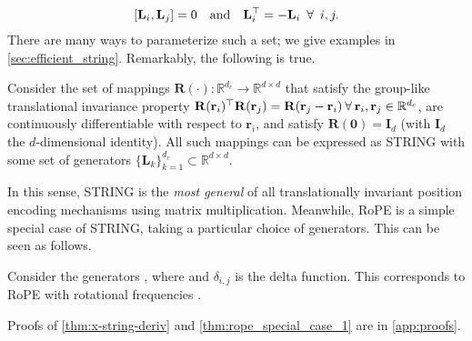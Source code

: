 \begin{equation}
    \left[\mathbf{L}_i, \mathbf{L}_j\right]=0  \quad \textrm{and} \quad \mathbf{L}_i^\top = -\mathbf{L}_i \hspace{0.5em} \forall \hspace{0.5em} i,j.
\end{equation}
There are many ways to parameterize such a set; we give examples in \cref{sec:efficient_string}.
Remarkably, the following is true. 
\begin{theorem} \label{thm:x-string-deriv}
Consider the set of mappings $\mathbf{R}(\cdot):\mathbb{R}^{d_c} \to \mathbb{R}^{d \times d}$ that satisfy the group-like translational invariance property $\mathbf{R}(\mathbf{r}_i)^\top \mathbf{R}(\mathbf{r}_j) = \mathbf{R}(\mathbf{r}_j - \mathbf{r}_i) \hspace{0.2em} \forall \hspace{0.2em} \mathbf{r}_i, \mathbf{r}_j \in \mathbb{R}^{d_c}$, are continuously differentiable with respect to $\mathbf{r}_i$, and satisfy $\mathbf{R}(\mathbf{0})=\mathbf{I}_d$ (with $\mathbf{I}_d$ the $d$-dimensional identity).
All such mappings can be expressed as STRING with some set of generators $\{\mathbf{L}_k\}_{k=1}^{d_c} \subset \mathbb{R}^{d \times d}$.
\end{theorem}
In this sense, STRING is the \emph{most general} of all translationally invariant position encoding mechanisms using matrix multiplication. 
Meanwhile, RoPE is a simple special case of STRING, taking a particular choice of generators.
This can be seen as follows. %
\begin{theorem} \label{thm:rope_special_case_1}
Consider the generators 
, where  and $\delta_{i,j}$ is the delta function.
This corresponds to RoPE with rotational frequencies .
\end{theorem}
Proofs of \cref{thm:x-string-deriv} and \cref{thm:rope_special_case_1} are in \cref{app:proofs}.

